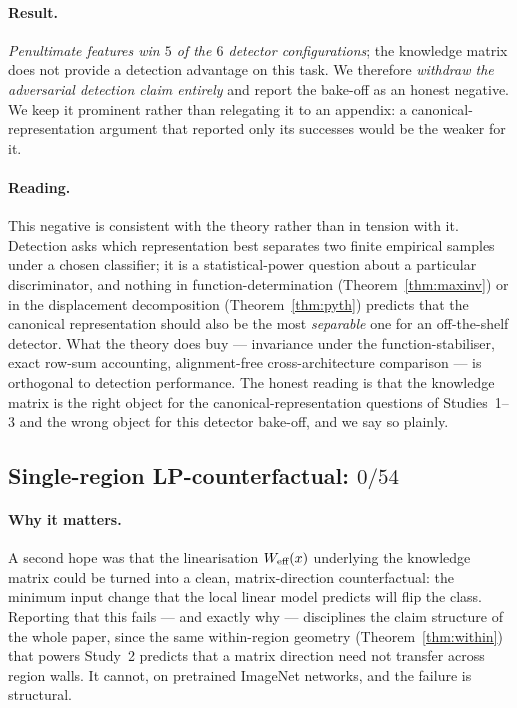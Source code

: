 \paragraph{Result.}
\emph{Penultimate features win $5$ of the $6$ detector configurations};
the knowledge matrix does not provide a detection advantage on this task.
We therefore \emph{withdraw the adversarial detection claim entirely} and
report the bake-off as an honest negative. We keep it prominent rather
than relegating it to an appendix: a canonical-representation argument that
reported only its successes would be the weaker for it.

\paragraph{Reading.}
This negative is consistent with the theory rather than in tension with
it. Detection asks which representation best separates two finite
empirical samples under a chosen classifier; it is a statistical-power
question about a particular discriminator, and nothing in
function-determination (Theorem~\ref{thm:maxinv}) or in the displacement
decomposition (Theorem~\ref{thm:pyth}) predicts that the canonical
representation should also be the most \emph{separable} one for an
off-the-shelf detector. What the theory does buy --- invariance under
the function-stabiliser, exact row-sum accounting, alignment-free
cross-architecture comparison --- is orthogonal to detection performance.
The honest reading is that the knowledge matrix is the right object for
the canonical-representation questions of Studies~1--3 and the wrong
object for this detector bake-off, and we say so plainly.

\subsection{Single-region LP-counterfactual: $0/54$}
\label{sec:study3-lp}

\paragraph{Why it matters.}
A second hope was that the linearisation $W_{\text{eff}}(x)$ underlying the
knowledge matrix could be turned into a clean, matrix-direction
counterfactual: the minimum input change that the local linear model
predicts will flip the class. Reporting that this fails --- and exactly
why --- disciplines the claim structure of the whole paper, since the same
within-region geometry (Theorem~\ref{thm:within}) that powers Study~2
predicts that a matrix direction need not transfer across region walls. It
cannot, on pretrained ImageNet networks, and the failure is structural.

